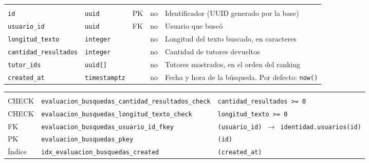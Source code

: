 {\small
\begin{xltabular}{\textwidth}{@{}>{\raggedright\arraybackslash}p{3.6cm} >{\raggedright\arraybackslash}p{2.3cm} >{\raggedright\arraybackslash}p{1cm} >{\centering\arraybackslash}p{0.85cm} L@{}}
    \toprule
     &  &  &  &  \\
    \midrule
    \endfirsthead
    \toprule
     &  &  &  &  \\
    \midrule
    \endhead
    \bottomrule
    \endfoot
    \texttt{id} & \texttt{uuid} & PK & no & Identificador (UUID generado por la base) \\
    \texttt{usuario\_\allowbreak{}id} & \texttt{uuid} & FK & no & Usuario que buscó \\
    \texttt{longitud\_\allowbreak{}texto} & \texttt{integer} &  & no & Longitud del texto buscado, en caracteres \\
    \texttt{cantidad\_\allowbreak{}resultados} & \texttt{integer} &  & no & Cantidad de tutores devueltos \\
    \texttt{tutor\_\allowbreak{}ids} & \texttt{uuid[]} &  & no & Tutores mostrados, en el orden del ranking \\
    \texttt{created\_\allowbreak{}at} & \texttt{timestamptz} &  & no & Fecha y hora de la búsqueda. Por defecto: \texttt{now(\allowbreak{})} \\
\end{xltabular}
}

{\small
\begin{xltabular}{\textwidth}{@{}>{\raggedright\arraybackslash}p{1.7cm} >{\raggedright\arraybackslash}p{4.6cm} L@{}}
    \toprule
     &  &  \\
    \midrule
    \endfirsthead
    \toprule
     &  &  \\
    \midrule
    \endhead
    \bottomrule
    \endfoot
    CHECK & \texttt{evaluacion\_\allowbreak{}busquedas\_\allowbreak{}cantidad\_\allowbreak{}resultados\_\allowbreak{}check} & \texttt{cantidad\_\allowbreak{}resultados \textgreater{}= 0} \\
    CHECK & \texttt{evaluacion\_\allowbreak{}busquedas\_\allowbreak{}longitud\_\allowbreak{}texto\_\allowbreak{}check} & \texttt{longitud\_\allowbreak{}texto \textgreater{}= 0} \\
    FK & \texttt{evaluacion\_\allowbreak{}busquedas\_\allowbreak{}usuario\_\allowbreak{}id\_\allowbreak{}fkey} & \texttt{(\allowbreak{}usuario\_\allowbreak{}id) $\rightarrow$ identidad.usuarios(\allowbreak{}id)} \\
    PK & \texttt{evaluacion\_\allowbreak{}busquedas\_\allowbreak{}pkey} & \texttt{(\allowbreak{}id)} \\
    Índice & \texttt{idx\_\allowbreak{}evaluacion\_\allowbreak{}busquedas\_\allowbreak{}created} & \texttt{(\allowbreak{}created\_\allowbreak{}at)} \\
\end{xltabular}
}


